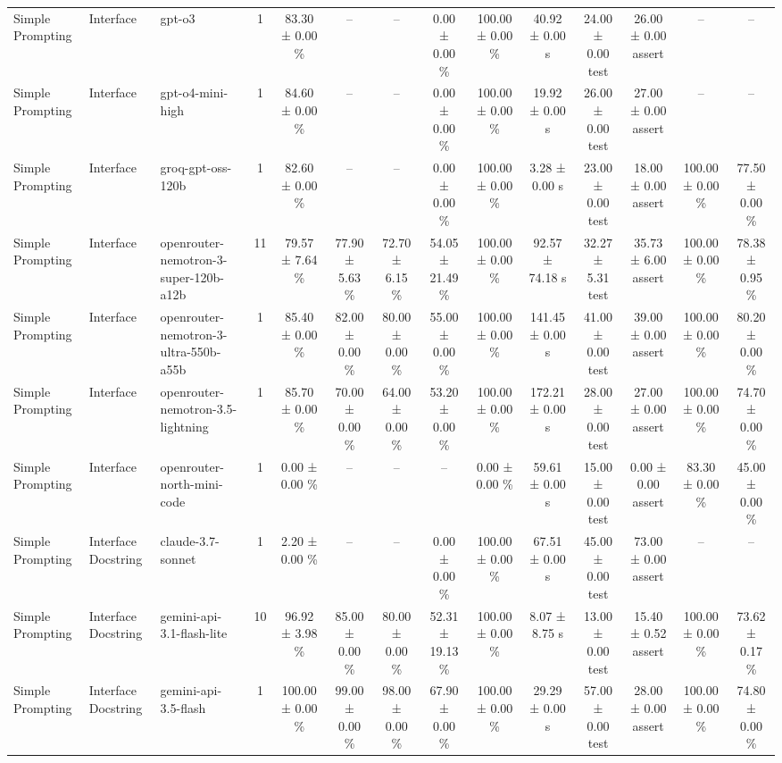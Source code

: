 \begin{table}[htbp]
\begin{tabular}{lllccccccccccc}
Simple Prompting & Interface & gpt-o3 & 1 & 83.30 ± 0.00 \% & – & – & 0.00 ± 0.00 \% & 100.00 ± 0.00 \% & 40.92 ± 0.00 s & 24.00 ± 0.00 test & 26.00 ± 0.00 assert & – & – \\
Simple Prompting & Interface & gpt-o4-mini-high & 1 & 84.60 ± 0.00 \% & – & – & 0.00 ± 0.00 \% & 100.00 ± 0.00 \% & 19.92 ± 0.00 s & 26.00 ± 0.00 test & 27.00 ± 0.00 assert & – & – \\
Simple Prompting & Interface & groq-gpt-oss-120b & 1 & 82.60 ± 0.00 \% & – & – & 0.00 ± 0.00 \% & 100.00 ± 0.00 \% & 3.28 ± 0.00 s & 23.00 ± 0.00 test & 18.00 ± 0.00 assert & 100.00 ± 0.00 \% & 77.50 ± 0.00 \% \\
Simple Prompting & Interface & openrouter-nemotron-3-super-120b-a12b & 11 & 79.57 ± 7.64 \% & 77.90 ± 5.63 \% & 72.70 ± 6.15 \% & 54.05 ± 21.49 \% & 100.00 ± 0.00 \% & 92.57 ± 74.18 s & 32.27 ± 5.31 test & 35.73 ± 6.00 assert & 100.00 ± 0.00 \% & 78.38 ± 0.95 \% \\
Simple Prompting & Interface & openrouter-nemotron-3-ultra-550b-a55b & 1 & 85.40 ± 0.00 \% & 82.00 ± 0.00 \% & 80.00 ± 0.00 \% & 55.00 ± 0.00 \% & 100.00 ± 0.00 \% & 141.45 ± 0.00 s & 41.00 ± 0.00 test & 39.00 ± 0.00 assert & 100.00 ± 0.00 \% & 80.20 ± 0.00 \% \\
Simple Prompting & Interface & openrouter-nemotron-3.5-lightning & 1 & 85.70 ± 0.00 \% & 70.00 ± 0.00 \% & 64.00 ± 0.00 \% & 53.20 ± 0.00 \% & 100.00 ± 0.00 \% & 172.21 ± 0.00 s & 28.00 ± 0.00 test & 27.00 ± 0.00 assert & 100.00 ± 0.00 \% & 74.70 ± 0.00 \% \\
Simple Prompting & Interface & openrouter-north-mini-code & 1 & 0.00 ± 0.00 \% & – & – & – & 0.00 ± 0.00 \% & 59.61 ± 0.00 s & 15.00 ± 0.00 test & 0.00 ± 0.00 assert & 83.30 ± 0.00 \% & 45.00 ± 0.00 \% \\
Simple Prompting & Interface Docstring & claude-3.7-sonnet & 1 & 2.20 ± 0.00 \% & – & – & 0.00 ± 0.00 \% & 100.00 ± 0.00 \% & 67.51 ± 0.00 s & 45.00 ± 0.00 test & 73.00 ± 0.00 assert & – & – \\
Simple Prompting & Interface Docstring & gemini-api-3.1-flash-lite & 10 & 96.92 ± 3.98 \% & 85.00 ± 0.00 \% & 80.00 ± 0.00 \% & 52.31 ± 19.13 \% & 100.00 ± 0.00 \% & 8.07 ± 8.75 s & 13.00 ± 0.00 test & 15.40 ± 0.52 assert & 100.00 ± 0.00 \% & 73.62 ± 0.17 \% \\
Simple Prompting & Interface Docstring & gemini-api-3.5-flash & 1 & 100.00 ± 0.00 \% & 99.00 ± 0.00 \% & 98.00 ± 0.00 \% & 67.90 ± 0.00 \% & 100.00 ± 0.00 \% & 29.29 ± 0.00 s & 57.00 ± 0.00 test & 28.00 ± 0.00 assert & 100.00 ± 0.00 \% & 74.80 ± 0.00 \% \\

\end{tabular}
\end{table}
